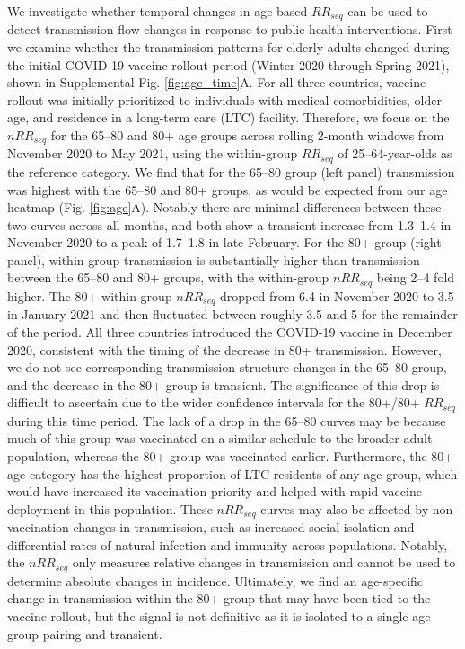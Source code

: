 \documentclass[11pt, letterpaper, oneside]{article}
\begin{document}
We investigate whether temporal changes in age-based $RR_{seq}$ can be used to detect transmission flow changes in response to public health interventions.
First we examine whether the transmission patterns for elderly adults changed during the initial COVID-19 vaccine rollout period (Winter 2020 through Spring 2021), shown in Supplemental Fig. \ref{fig:age_time}A.
For all three countries, vaccine rollout was initially prioritized to individuals with medical comorbidities, older age, and residence in a long-term care (LTC) facility.
Therefore, we focus on the $nRR_{seq}$ for the 65--80 and 80+ age groups across rolling 2-month windows from November 2020 to May 2021, using the within-group $RR_{seq}$ of 25--64-year-olds as the reference category.
We find that for the 65--80 group (left panel) transmission was highest with the 65--80 and 80+ groups, as would be expected from our age heatmap (Fig. \ref{fig:age}A).
Notably there are minimal differences between these two curves across all months, and both show a transient increase from 1.3--1.4 in November 2020 to a peak of 1.7--1.8 in late February.
For the 80+ group (right panel), within-group transmission is substantially higher than transmission between the 65--80 and 80+ groups, with the within-group $nRR_{seq}$ being 2--4 fold higher.
The 80+ within-group $nRR_{seq}$ dropped from 6.4 in November 2020 to 3.5 in January 2021 and then fluctuated between roughly 3.5 and 5 for the remainder of the period.
All three countries introduced the COVID-19 vaccine in December 2020, consistent with the timing of the decrease in 80+ transmission.
However, we do not see corresponding transmission structure changes in the 65--80 group, and the decrease in the 80+ group is transient.
The significance of this drop is difficult to ascertain due to the wider confidence intervals for the 80+/80+ $RR_{seq}$ during this time period.
The lack of a drop in the 65--80 curves may be because much of this group was vaccinated on a similar schedule to the broader adult population, whereas the 80+ group was vaccinated earlier.
Furthermore, the 80+ age category has the highest proportion of LTC residents of any age group, which would have increased its vaccination priority and helped with rapid vaccine deployment in this population.
These $nRR_{seq}$ curves may also be affected by non-vaccination changes in transmission, such as increased social isolation and differential rates of natural infection and immunity across populations.
Notably, the $nRR_{seq}$ only measures relative changes in transmission and cannot be used to determine absolute changes in incidence.
Ultimately, we find an age-specific change in transmission within the 80+ group that may have been tied to the vaccine rollout, but the signal is not definitive as it is isolated to a single age group pairing and transient.
\end{document}
